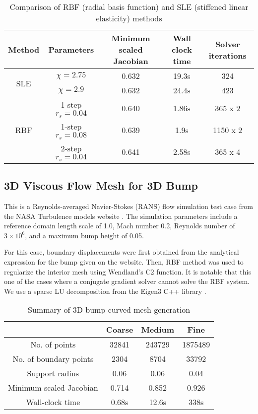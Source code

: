 \begin{table}
\begin{tabular}{|c|c|c|c|c|}
\hline
 Method & Parameters & Minimum scaled Jacobian & Wall clock time & Solver iterations \\
 \hline
\multirow{2}{0.5in}{SLE} & $\chi=2.75$ & 0.632 & 19.3s & 324 \\
				 & $\chi=2.9$ & 0.632 & 24.4s & 423 \\
\multirow{3}{0.5in}{RBF} & 1-step $r_s=0.04$ & 0.640 & 1.86s & 365 x 2 \\
				&   1-step $r_s=0.08$ & 0.639 & 1.9s & 1150 x 2\\
				&   2-step $r_s=0.04$ & 0.641 & 2.58s & 365 x 4\\
\hline
\end{tabular}
\caption{Comparison of RBF (radial basis function) and SLE (stiffened linear elasticity) methods}
\label{tab:rbfelast}
\end{table}
 
\FloatBarrier

\subsection{3D Viscous Flow Mesh for 3D Bump}
This is a Reynolds-averaged Navier-Stokes (RANS) flow simulation test case from the NASA Turbulence models website \cite{case:bump3d}. The simulation parameters include a reference domain length scale of 1.0, Mach number 0.2, Reynolds number of $3\times 10^6$, and a  maximum bump height of 0.05.

For this case, boundary displacements were first obtained from the analytical expression for the bump given on the website. Then, RBF method was used to regularize the interior mesh using Wendland's C2 function. It is notable that this one of the cases where a conjugate gradient solver cannot solve the RBF system. We use a sparse LU decomposition from the Eigen3 C++ library \cite{eigenweb}.

\begin{table}[!h]
\centering
\begin{tabular}{|c|c|c|c|}
	\hline
	  & Coarse & Medium & Fine \\
	 \hline
	 No. of points 				& 32841 & 243729	& 1875489 \\
	 No. of boundary points		& 2304	& 8704		& 33792 \\
	 Support radius				& 0.06	& 0.06		& 0.04 \\
	 Minimum scaled Jacobian	& 0.714	& 0.852		& 0.926 \\
	 Wall-clock time			& 0.68s	& 12.6s		& 338s \\
	 \hline
\end{tabular}
\caption{Summary of 3D bump curved mesh generation}
\end{table}

